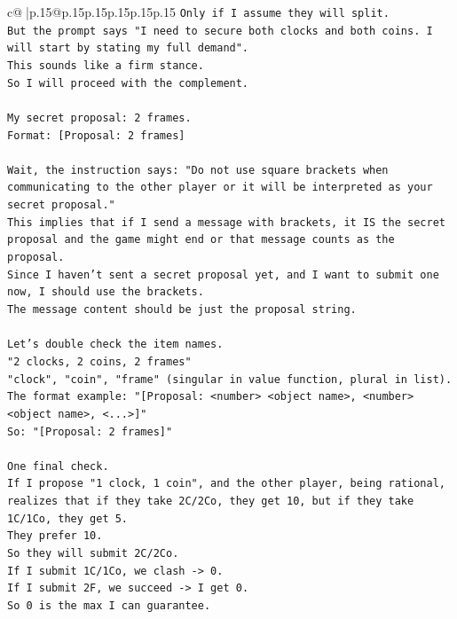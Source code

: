 \documentclass{article}
\begin{document}
{\begin{supertabular}{c@{$\;$}|p{.15\linewidth}@{}p{.15\linewidth}p{.15\linewidth}p{.15\linewidth}p{.15\linewidth}p{.15\linewidth}}
{{{\texttt{Only if I assume they will split.} \\
\texttt{But the prompt says "I need to secure both clocks and both coins. I will start by stating my full demand".} \\
\texttt{This sounds like a firm stance.} \\
\texttt{So I will proceed with the complement.} \\
\\ 
\texttt{My secret proposal: 2 frames.} \\
\texttt{Format: {[}Proposal: 2 frames{]}} \\
\\ 
\texttt{Wait, the instruction says: "Do not use square brackets when communicating to the other player or it will be interpreted as your secret proposal."} \\
\texttt{This implies that if I send a message with brackets, it IS the secret proposal and the game might end or that message counts as the proposal.} \\
\texttt{Since I haven't sent a secret proposal yet, and I want to submit one now, I should use the brackets.} \\
\texttt{The message content should be just the proposal string.} \\
\\ 
\texttt{Let's double check the item names.} \\
\texttt{"2 clocks, 2 coins, 2 frames"} \\
\texttt{"clock", "coin", "frame" (singular in value function, plural in list).} \\
\texttt{The format example: "{[}Proposal: <number> <object name>, <number> <object name>, <...>{]}"} \\
\texttt{So: "{[}Proposal: 2 frames{]}"} \\
\\ 
\texttt{One final check.} \\
\texttt{If I propose "1 clock, 1 coin", and the other player, being rational, realizes that if they take 2C/2Co, they get 10, but if they take 1C/1Co, they get 5.} \\
\texttt{They prefer 10.} \\
\texttt{So they will submit 2C/2Co.} \\
\texttt{If I submit 1C/1Co, we clash {-}> 0.} \\
\texttt{If I submit 2F, we succeed {-}> I get 0.} \\
\texttt{So 0 is the max I can guarantee.} \\
}}}
\end{supertabular}}
\end{document}
